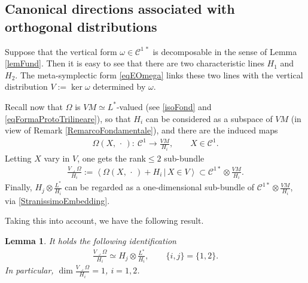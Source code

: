 \documentclass[10pt,a4paper]{amsart}
\newcommand{\C}{\mathcal{C}}
\newcommand{\Span}[1]{\left\langle #1 \right\rangle}
\newcommand{\elle}{H}
\numberwithin{equation}{section}
\newtheorem{Lemma}[Theorem]{Lemma}
\begin{document}
\subsection{Canonical directions associated with orthogonal distributions}

Suppose that the vertical form $\omega\in \C^{1\,\ast}$ is decomposable in the sense of Lemma \ref{lemFund}. Then it is easy to see that there are two characteristic lines $\elle_1$ and $\elle_2$.
The meta-symplectic form \eqref{eqEOmega} links these two lines with the vertical distribution $V:=\ker\omega$ determined by $\omega$.

Recall now that $\Omega$ is $VM\simeq L^*$-valued (see \eqref{isoFond} and \eqref{eqFormaProtoTrilineare}), so that $H_i$ can be considered as a subspace of $VM$ (in view of Remark \ref{RemarcoFondamentale}), and there are the induced maps
\begin{gather*}
 \Omega(X,\,\cdot\, )\colon \ \C^1\longrightarrow \frac{VM}{H_i} ,\qquad X\in\C^1 .
\end{gather*}
Letting $X$ vary in $V$, one gets the rank$\leq 2$ sub-bundle
\begin{gather*}
\frac{V\lrcorner \Omega}{H_i}:=\Span{ \Omega(X,\,\cdot\, )+ H_i\,|\, X\in V }\subset \C^{1\ast}\otimes \frac{VM}{H_i} .
\end{gather*}
Finally, $\elle_j\otimes\frac{L^\ast}{\elle_i}$ can be regarded as a one-dimensional sub-bundle of $\C^{1\ast}\otimes \frac{VM}{H_i}$, via \eqref{StranissimoEmbedding}.

Taking this into account, we have the following result.

\begin{Lemma}\label{lemma.strano}It holds the following identification
\begin{gather*}
 \frac{V\lrcorner \Omega}{\elle_i}\simeq\elle_j\otimes\frac{L^\ast}{\elle_i},\qquad \{i,j\}=\{1,2\}.
\end{gather*}
In particular,
$\dim\frac{V\lrcorner \Omega}{\elle_i}=1$, $ i=1,2$.
\end{Lemma}
\end{document}
